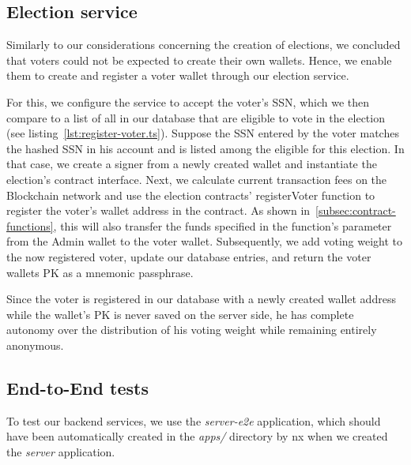 
\subsection{Election service}\label{subsec:election-service}

Similarly to our considerations concerning the creation of elections, we concluded that voters could not be expected to create their own wallets.
Hence, we enable them to create and register a voter wallet through our election service.

For this, we configure the service to accept the voter's \gls{SSN}, which we then compare to a list of all  in our database that are eligible to vote in the election (see listing~\ref{lst:register-voter.ts}).
Suppose the \gls{SSN} entered by the voter matches the hashed \gls{SSN} in his account and is listed among the eligible  for this election.
In that case, we create a signer from a newly created wallet and instantiate the election's contract interface.
Next, we calculate current transaction fees on the \gls{Blockchain} network and use the election contracts' registerVoter function to register the voter's wallet address in the contract.
As shown in~\cref{subsec:contract-functions}, this will also transfer the funds specified in the function's parameter from the \gls{Admin} wallet to the voter wallet.
Subsequently, we add voting weight to the now registered voter, update our database entries, and return the voter wallets \gls{PK} as a mnemonic passphrase.

Since the voter is registered in our database with a newly created wallet address while the wallet's \gls{PK} is never saved on the server side, he has complete autonomy over the distribution of his voting weight while remaining entirely anonymous.


\subsection{End-to-End tests}\label{subsec:e2e-tests}

To test our backend services, we use the \emph{server-e2e} application, which should have been automatically created in the \emph{apps/} directory by nx when we created the \emph{server} application.

